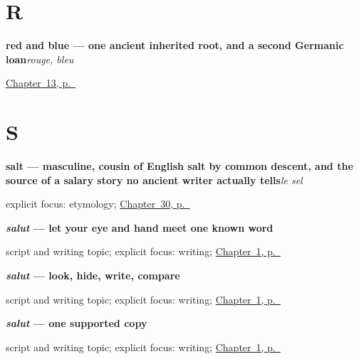 \section*{R}

\noindent\begin{minipage}[t]{\linewidth}
\raggedright
\textbf{red and blue — one ancient inherited root, and a second Germanic loan}\enspace\emph{rouge, bleu}\par
\footnotesize \hyperref[ch:colours]{Chapter~13, p.~\pageref*{ch:colours}}
\end{minipage}\par\smallskip

\section*{S}

\noindent\begin{minipage}[t]{\linewidth}
\raggedright
\textbf{salt — masculine, cousin of English salt by common descent, and the source of a salary story no ancient writer actually tells}\enspace\emph{le sel}\par
\footnotesize explicit focus: etymology; \hyperref[ch:fr-cheese-butter-salt-egg]{Chapter~30, p.~\pageref*{ch:fr-cheese-butter-salt-egg}}
\end{minipage}\par\smallskip

\noindent\begin{minipage}[t]{\linewidth}
\raggedright
\textbf{\emph{salut} — let your eye and hand meet one known word}\par
\footnotesize script and writing topic; explicit focus: writing; \hyperref[ch:greetings]{Chapter~1, p.~\pageref*{ch:greetings}}
\end{minipage}\par\smallskip

\noindent\begin{minipage}[t]{\linewidth}
\raggedright
\textbf{\emph{salut} — look, hide, write, compare}\par
\footnotesize script and writing topic; explicit focus: writing; \hyperref[ch:greetings]{Chapter~1, p.~\pageref*{ch:greetings}}
\end{minipage}\par\smallskip

\noindent\begin{minipage}[t]{\linewidth}
\raggedright
\textbf{\emph{salut} — one supported copy}\par
\footnotesize script and writing topic; explicit focus: writing; \hyperref[ch:greetings]{Chapter~1, p.~\pageref*{ch:greetings}}
\end{minipage}\par\smallskip

